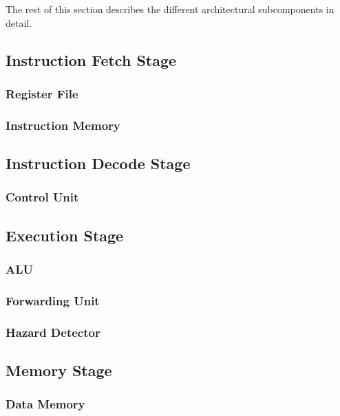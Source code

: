 

The rest of this section describes the different architectural subcomponents in detail.




\subsection{Instruction Fetch Stage}
\newpage
\subsubsection{Register File}
\newpage
\subsubsection{Instruction Memory}
\newpage
\subsection{Instruction Decode Stage}
\newpage
\subsubsection{Control Unit}
\newpage
\subsection{Execution Stage}
\newpage
\subsubsection{ALU}

\newpage
\subsubsection{Forwarding Unit}
\newpage
\subsubsection{Hazard Detector}
\newpage
\subsection{Memory Stage}
\newpage
\subsubsection{Data Memory}
\newpage
